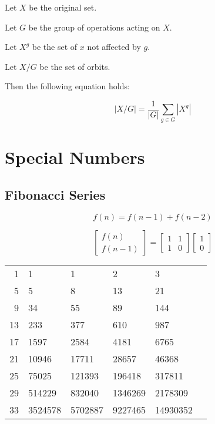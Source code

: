 \documentclass[twocolumn]{article}
\begin{document}
Let $X$ be the original set.

Let $G$ be the group of operations acting on $X$.

Let $X^g$ be the set of $x$ not affected by $g$.

Let $X/G$ be the set of orbits.

Then the following equation holds:

$$
|X/G| = \frac{1}{|G|} \sum_{g \in G} |X^g|
$$

\section{Special Numbers}

\subsection{Fibonacci Series}

$$f(n)=f(n-1)+f(n-2)$$

\begin{equation*}
    \begin{bmatrix}
        f(n) \\
        f(n - 1)
    \end{bmatrix}
    =
    \begin{bmatrix}
        1 & 1 \\
        1 & 0
    \end{bmatrix}
    \begin{bmatrix}
        1 \\
        0
    \end{bmatrix}
\end{equation*}

\begin{center}
    \begin{tabular}{r|lllll}
        1 & 1 & 1 & 2 & 3 \\
        5 & 5 & 8 & 13 & 21 \\
        9 & 34 & 55 & 89 & 144 \\
        13 & 233 & 377 & 610 & 987 \\
        17 & 1597 & 2584 & 4181 & 6765 \\
        21 & 10946 & 17711 & 28657 & 46368 \\
        25 & 75025 & 121393 & 196418 & 317811 \\
        29 & 514229 & 832040 & 1346269 & 2178309 \\
        33 & 3524578 & 5702887 & 9227465 & 14930352
    \end{tabular}
\end{center}
\end{document}
